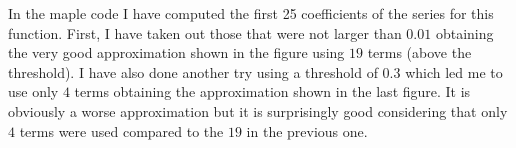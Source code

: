 \begin{questions}

\begin{solution}
In the maple code I have computed the first 25 coefficients of the series for this function. First, I have taken out those that were not larger than $0.01$ obtaining the very good approximation shown in the figure using $19$ terms (above the threshold). I have also done another try using a threshold of $0.3$ which led me to use only $4$ terms obtaining the approximation shown in the last figure. It is obviously a worse approximation but it is surprisingly good considering that only $4$ terms were used compared to the $19$ in the previous one.
\end{solution}
\end{questions}
